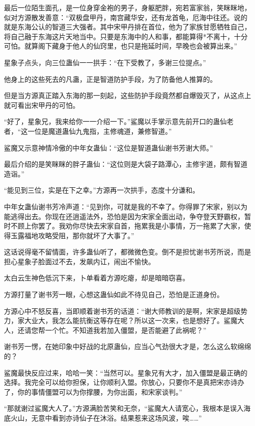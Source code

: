 \begin{this_body}
最后一位陌生面孔，是一位身穿金袍的男子，身躯肥胖，宛若富家翁，笑眯眯地，似对方源散发善意：“双极盘甲丹，南宫藏华安，还有龙首龟，厄海中往还。说的就是东海公认的智道三大强者。其中宋甲丹排在首位，他为了家族甘愿牺牲自己，将自己融于东海这片天地当中。只要是东海中的人和事，都能算得*不离十，十分可怕。就算阁下藏身于他人的仙窍里，也只是拖延时间，早晚也会被算出来。”

星象子点头，向三位蛊仙一一拱手：“在下受教了，多谢三位提点。”

他身上的这些死去的凡蛊，正是智道防护手段，为了防备他人推算的。

但是当方源真正踏入东海的那一刻起，这些防护手段竟然都自爆毁灭了，从这点上就可看出宋甲丹的可怕。

“好了，星象兄，我来给你一一介绍一下。”鲨魔以手掌示意先前开口的蛊仙老者，“这一位是魔道蛊仙九鬼指，主修魂道，兼修智道。”

鲨魔又示意神情冷傲的中年女蛊仙：“这位是智道蛊仙谢书芳谢大师。”

最后介绍的是笑眯眯的胖子蛊仙：“这位则是大袋子路潭心，主修宇道，颇有智道造诣。”

“能见到三位，实是在下之幸。”方源再一次拱手，态度十分谦和。

中年女蛊仙谢书芳冷声道：“见到你，可就是我的不幸了。你得罪了宋家，别以为能逃得出去。你现在还逍遥法外，恐怕是因为宋家全面出动，争夺登天野霸权，暂时不顾上你罢了。我劝你尽快去宋家自首，拖累我是小事情，万一拖累了大家，使得玉露福地攻略受阻，那你就坏了大事了。”

这话说得毫不留情面，许多蛊仙听了，都微微色变。倒不是担忧谢书芳所说，而是担心星象子脸面过不去，发飙内讧，闹出不愉快。

太白云生神色低沉下来，卜单看着方源吃瘪，却是暗暗窃喜。

方源打量了谢书芳一眼，心想这蛊仙如此不待见自己，恐怕是正道身份。

方源心中不怒反喜，当即顺着谢书芳的话道：“谢大师教训的是啊，宋家是超级势力，家大业大，我怎么能抗衡这等存在呢？所以这一次来，也是想好了。鲨魔大人，还请您帮一个忙。不知道我若加入僵盟，是否能避了此祸呢？”

谢书芳一愣，在她印象中好战的北原蛊仙，应当心气劲很大才是，怎么这么软绵绵的？

鲨魔最快反应过来，哈哈一笑：“当然可以。星象兄有大才，加入僵盟是最正确的选择。我完全可以给你担保，让你顺利入盟。你放心，只要你不是真把宋亦诗办了，你的事情僵盟可以为你撑腰，为你出面，和宋家谈判。”

“那就谢过鲨魔大人了。”方源满脸苦笑和无奈，“鲨魔大人请宽心，我根本是误入海底火山，无意中看到亦诗仙子在沐浴。结果惹来这场风波，唉……”


\end{this_body}
